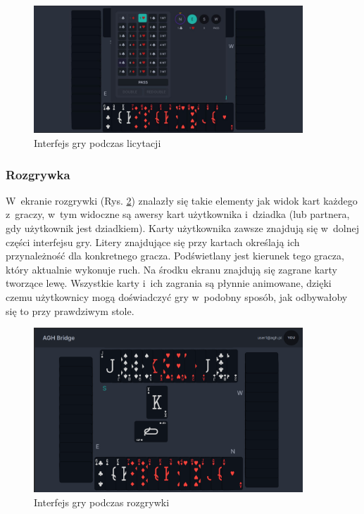 \begin{figure}[h!]
  \centering
  \includegraphics[width=0.9\textwidth]{img/widoki/bidding.png}
  \caption{Interfejs gry podczas licytacji}
  \label{fig:bidding}
\end{figure}

\FloatBarrier

\subsubsection{Rozgrywka}

W~ekranie rozgrywki (Rys. \ref{fig:game}) znalazły się takie
elementy jak widok
kart każdego z~graczy, w~tym widoczne są awersy kart
użytkownika i~dziadka (lub partnera, gdy użytkownik jest
dziadkiem). Karty użytkownika zawsze znajdują się w~dolnej
części interfejsu gry. Litery znajdujące się przy kartach określają
ich przynależność dla konkretnego gracza. Podświetlany jest
kierunek tego gracza, który aktualnie wykonuje ruch.
Na środku ekranu znajdują się zagrane karty tworzące lewę.
Wszystkie karty i~ich zagrania są płynnie animowane,
dzięki czemu użytkownicy mogą doświadczyć gry
w~podobny sposób, jak odbywałoby się to przy prawdziwym stole.

\begin{figure}[h!]
  \centering
  \includegraphics[width=0.9\textwidth]{img/widoki/game.png}
  \caption{Interfejs gry podczas rozgrywki}
  \label{fig:game}
\end{figure}

